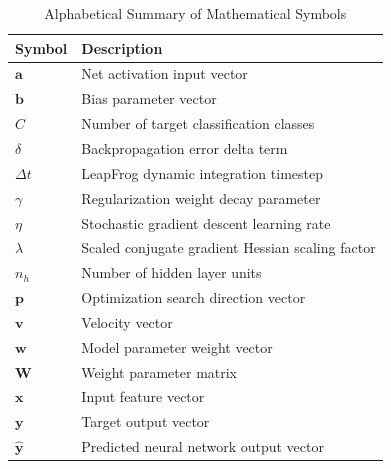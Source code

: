\documentclass[10pt, conference]{IEEEtran}
\begin{document}
\begin{table}[t]
\caption{Alphabetical Summary of Mathematical Symbols}
\label{tab:symbols}
\centering
\begin{tabular}{ll}
\toprule
Symbol & Description \\
\midrule
$\mathbf{a}$ & Net activation input vector \\
$\mathbf{b}$ & Bias parameter vector \\
$C$ & Number of target classification classes \\
$\delta$ & Backpropagation error delta term \\
$\Delta t$ & LeapFrog dynamic integration timestep \\
$\gamma$ & Regularization weight decay parameter \\
$\eta$ & Stochastic gradient descent learning rate \\
$\lambda$ & Scaled conjugate gradient Hessian scaling factor \\
$n_h$ & Number of hidden layer units \\
$\mathbf{p}$ & Optimization search direction vector \\
$\mathbf{v}$ & Velocity vector \\
$\mathbf{w}$ & Model parameter weight vector \\
$\mathbf{W}$ & Weight parameter matrix \\
$\mathbf{x}$ & Input feature vector \\
$\mathbf{y}$ & Target output vector \\
$\mathbf{\hat{y}}$ & Predicted neural network output vector \\
\bottomrule
\end{tabular}
\end{table}
\end{document}
